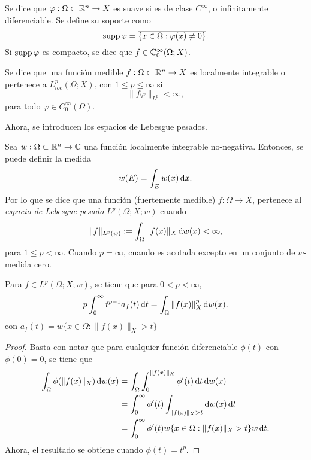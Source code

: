 \begin{definition}
		Se dice que $\varphi:\Omega\subset\mathbb{R}^n\rightarrow X$ es suave si es de clase $C^\infty$, o infinitamente diferenciable.  Se define su soporte como 
		\begin{equation*}
			\operatorname{supp} \varphi = \overline{\{x\in\Omega:\varphi(x)\neq 0\}}.
		\end{equation*}
		Si $\operatorname{supp} \varphi$ es compacto, se dice que $f\in\mathbb{C}^\infty_0(\Omega;X)$.
\end{definition}
\begin{definition}
	Se dice que una función medible $f:\Omega\subset\mathbb{R}^n\rightarrow X$ es localmente integrable o pertenece a $L^{p}_{loc}(\Omega; X)$, con $1\leq p\leq\infty$ si 
	\begin{equation*}
		\|f\varphi\|_{L^p} < \infty,
	\end{equation*} 
	para todo $\varphi\in C^\infty_0(\Omega)$.
\end{definition}
Ahora, se introducen los espacios de Lebesgue pesados.
\begin{definition}
	Sea $w:\Omega\subset\mathbb{R}^n\to\mathbb{C}$ una función localmente integrable no-negativa. Entonces, se puede definir la medida
	\begin{equation*}
		w(E) = \int_E w(x)\mathop{}\!\mathrm{d} x.
	\end{equation*}
	Por lo que se dice que una función (fuertemente medible) $f:\Omega\to X$, pertenece al \textit{espacio de Lebesgue pesado} $L^p(\Omega;X;w)$ cuando 
	\begin{equation*}
		\|f\|_{L^p(w)} := \int_\Omega \|f(x)\|_X \mathop{}\!\mathrm{d} w(x) < \infty,
	\end{equation*}
	para $1\leq p<\infty$. Cuando $p=\infty$, cuando es acotada excepto en un conjunto de $w$-medida cero.
\end{definition}
\begin{proposition}
	Para $f\in L^p(\Omega;X;w)$, se tiene que para $0< p<\infty$,
	\begin{equation*}
		p\int_0^\infty t^{p-1} a_f(t) \mathop{}\!\mathrm{d} t = \int_\Omega \|f(x)\|_X^p \mathop{}\!\mathrm{d} w(x).
	\end{equation*}
	con $a_f(t) = w\{x\in\Omega: \|f(x)\|_X>t\}$
\end{proposition}
\begin{proof}
	Basta con notar que para cualquier función diferenciable $\phi(t)$ con $\phi(0)=0$, se tiene que
	\begin{align*}
		\int_\Omega \phi(\|f(x)\|_X) \mathop{}\!\mathrm{d} w(x) & = \int_\Omega \int_0^{\|f(x)\|_X} \phi'(t) \mathop{}\!\mathrm{d} t \mathop{}\!\mathrm{d} w(x) \\
		& = \int_0^\infty \phi'(t) \int_{\|f(x)\|_X>t}  \mathop{}\!\mathrm{d} w(x) \mathop{}\!\mathrm{d} t \\
		& = \int_0^\infty \phi'(t) w\{x\in\Omega: \|f(x)\|_X>t\}w \mathop{}\!\mathrm{d} t.
	\end{align*}
	Ahora, el resultado se obtiene cuando $\phi(t) = t^p$.
\end{proof}
